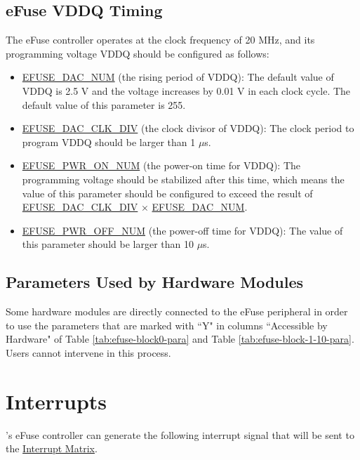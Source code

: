 \documentclass[main\_\_EN.tex]{subfiles}
\begin{document}
\subsection{eFuse VDDQ Timing}
\label{sec:efuse-vddq-timing}

The eFuse controller operates at the clock frequency of 20 MHz, and its programming voltage VDDQ should be configured as follows: 

\begin{itemize}
    \item \hyperref[fielddesc:EFUSEDACNUM]{EFUSE\_DAC\_NUM} (the rising period of VDDQ): The default value of VDDQ is 2.5 V and the voltage increases by 0.01 V in each clock cycle. The default value of this parameter is 255.
    \item \hyperref[fielddesc:EFUSEDACCLKDIV]{EFUSE\_DAC\_CLK\_DIV} (the clock divisor of VDDQ): The clock period to program VDDQ should be larger than 1 $\mu$s.
    \item \hyperref[fielddesc:EFUSEPWRONNUM]{EFUSE\_PWR\_ON\_NUM} (the power-on time for VDDQ): The programming voltage should be stabilized after this time, which means the value of this parameter should be configured to exceed the result of \hyperref[fielddesc:EFUSEDACCLKDIV] {EFUSE\_DAC\_CLK\_DIV} × \hyperref[fielddesc:EFUSEDACNUM]{EFUSE\_DAC\_NUM}.
    \item \hyperref[fielddesc:EFUSEPWROFFNUM]{EFUSE\_PWR\_OFF\_NUM} (the power-off time for VDDQ): The value of this parameter should be larger than 10 $\mu$s.
\end{itemize}



\subsection{Parameters Used by Hardware Modules}

Some hardware modules are directly connected to the eFuse peripheral in order to use the parameters that are marked with ``Y" in columns ``Accessible by Hardware" of Table \ref{tab:efuse-block0-para} and Table \ref{tab:efuse-block-1-10-para}. Users cannot intervene in this process.

\section{Interrupts}

\chipname{}'s eFuse controller can generate the following interrupt signal that will be sent to the \hyperref[mod:intmtrx]{Interrupt Matrix}.
\end{document}
